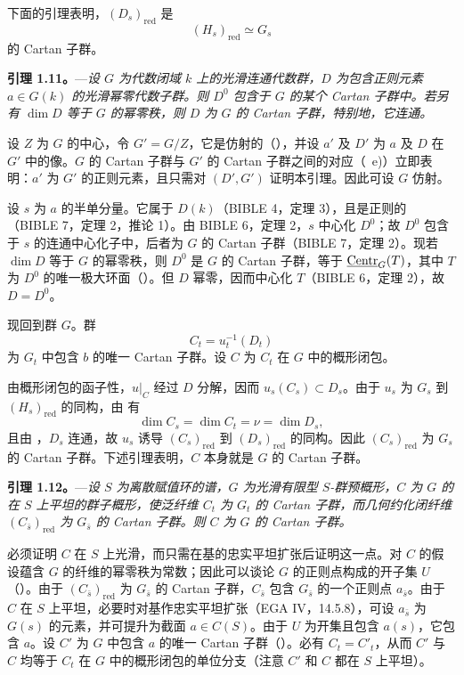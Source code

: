 下面的引理表明，\((D_s)_{\mathrm{red}}\) 是
\[
  (H_s)_{\mathrm{red}}\simeq G_s
\]
的 Cartan 子群。

\medskip
\noindent{}%
\textbf{引理 1.11。}---\textit{设 \(G\) 为代数闭域 \(k\) 上的光滑连通代数群，\(D\) 为包含正则元素 \(a\in G(k)\) 的光滑幂零代数子群。则 \(D^0\) 包含于 \(G\) 的某个 Cartan 子群中。若另有 \(\dim D\) 等于 \(G\) 的幂零秩，则 \(D\) 为 \(G\) 的 Cartan 子群，特别地，它连通。}

设 \(Z\) 为 \(G\) 的中心，令 \(G'=G/Z\)，它是仿射的（），并设 \(a'\) 及 \(D'\) 为 \(a\) 及 \(D\) 在 \(G'\) 中的像。\(G\) 的 Cartan 子群与 \(G'\) 的 Cartan 子群之间的对应（~e)）立即表明：\(a'\) 为 \(G'\) 的正则元素，且只需对 \((D',G')\) 证明本引理。因此可设 \(G\) 仿射。

设 \(s\) 为 \(a\) 的半单分量。它属于 \(D(k)\)（BIBLE 4，定理 3），且是正则的（BIBLE 7，定理 2，推论 1）。由 BIBLE 6，定理 2，\(s\) 中心化 \(D^0\)；故 \(D^0\) 包含于 \(s\) 的连通中心化子中，后者为 \(G\) 的 Cartan 子群（BIBLE 7，定理 2）。现若 \(\dim D\) 等于 \(G\) 的幂零秩，则 \(D^0\) 是 \(G\) 的 Cartan 子群，等于 \(\underline{\operatorname{Centr}}_G(T)\)，其中 \(T\) 为 \(D^0\) 的唯一极大环面（）。但 \(D\) 幂零，因而中心化 \(T\)（BIBLE 6，定理 2），故 \(D=D^0\)。

现回到群 \(G\)。群
\[
  C_t=u_t^{-1}(D_t)
\]
为 \(G_t\) 中包含 \(b\) 的唯一 Cartan 子群。设 \(C\) 为 \(C_t\) 在 \(G\) 中的概形闭包。

由概形闭包的函子性，\(u|_C\) 经过 \(D\) 分解，因而 \(u_s(C_s)\subset D_s\)。由于 \(u_s\) 为 \(G_s\) 到 \((H_s)_{\mathrm{red}}\) 的同构，由  有
\[
  \dim C_s=\dim C_t=\nu=\dim D_s,
\]
且由 ，\(D_s\) 连通，故 \(u_s\) 诱导 \((C_s)_{\mathrm{red}}\) 到 \((D_s)_{\mathrm{red}}\) 的同构。因此 \((C_s)_{\mathrm{red}}\) 为 \(G_s\) 的 Cartan 子群。下述引理表明，\(C\) 本身就是 \(G\) 的 Cartan 子群。

\medskip
\noindent{}%
\textbf{引理 1.12。}---\textit{设 \(S\) 为离散赋值环的谱，\(G\) 为光滑有限型 \(S\)-群预概形，\(C\) 为 \(G\) 的在 \(S\) 上平坦的群子概形，使泛纤维 \(C_t\) 为 \(G_t\) 的 Cartan 子群，而几何约化闭纤维 \((C_{\bar s})_{\mathrm{red}}\) 为 \(G_{\bar s}\) 的 Cartan 子群。则 \(C\) 为 \(G\) 的 Cartan 子群。}

必须证明 \(C\) 在 \(S\) 上光滑，而只需在基的忠实平坦扩张后证明这一点。对 \(C\) 的假设蕴含 \(G\) 的纤维的幂零秩为常数；因此可以谈论 \(G\) 的正则点构成的开子集 \(U\)（）。由于 \((C_{\bar s})_{\mathrm{red}}\) 为 \(G_{\bar s}\) 的 Cartan 子群，\(C_{\bar s}\) 包含 \(G_{\bar s}\) 的一个正则点 \(a_{\bar s}\)。由于 \(C\) 在 \(S\) 上平坦，必要时对基作忠实平坦扩张（EGA IV，14.5.8），可设 \(a_{\bar s}\) 为 \(G(s)\) 的元素，并可提升为截面 \(a\in C(S)\)。由于 \(U\) 为开集且包含 \(a(s)\)，它包含 \(a\)。设 \(C'\) 为 \(G\) 中包含 \(a\) 的唯一 Cartan 子群（）。必有 \(C_t=C'_t\)，从而 \(C'\) 与 \(C\) 均等于 \(C_t\) 在 \(G\) 中的概形闭包的单位分支（注意 \(C'\) 和 \(C\) 都在 \(S\) 上平坦）。

